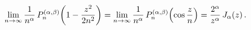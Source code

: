 \[\lim_{n\to\infty}\frac{1}{n^{\alpha}}\mathop{P^{(\alpha,\beta)}_{n}\/}%
\nolimits\!\left(1-\frac{z^{2}}{2n^{2}}\right)=\lim_{n\to\infty}\frac{1}{n^{%
\alpha}}\mathop{P^{(\alpha,\beta)}_{n}\/}\nolimits\!\left(\mathop{\cos\/}%
\nolimits\frac{z}{n}\right)=\frac{2^{\alpha}}{z^{\alpha}}\mathop{J_{\alpha}\/}%
\nolimits\!\left(z\right).\]